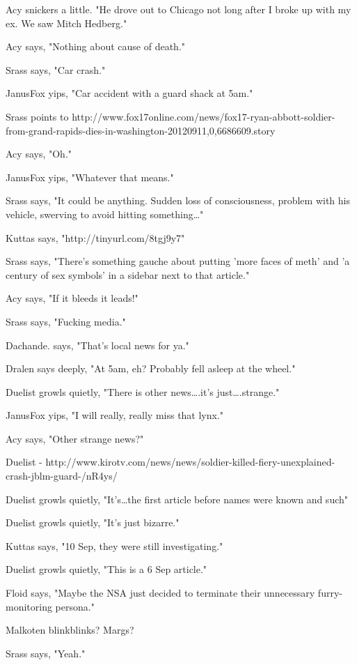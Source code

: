 \begin{hangparas}{2em}{1}
Acy snickers a little. "He drove out to Chicago not long after I broke up with my ex.  We saw Mitch Hedberg."

Acy says, "Nothing about cause of death."

Srass says, "Car crash."

JanusFox yips, "Car accident with a guard shack at 5am."

Srass points to http://www.fox17online.com/news/fox17-ryan-abbott-soldier-from-grand-rapids-dies-in-washington-20120911,0,6686609.story

Acy says, "Oh."

JanusFox yips, "Whatever that means."

Srass says, "It could be anything.  Sudden loss of consciousness, problem with his vehicle, swerving to avoid hitting something\ldots{}"

Kuttas says, "http://tinyurl.com/8tgj9y7"

Srass says, "There's something gauche about putting 'more faces of meth' and 'a century of sex symbols' in a sidebar next to that article."

Acy says, "If it bleeds it leads!"

Srass says, "Fucking media."

Dachande. says, "That's local news for ya."

Dralen says deeply, "At 5am, eh? Probably fell asleep at the wheel."

Duelist growls quietly, "There is other news\ldots{}.it's just\ldots{}.strange."

JanusFox yips, "I will really, really miss that lynx."

Acy says, "Other strange news?"

Duelist - http://www.kirotv.com/news/news/soldier-killed-fiery-unexplained-crash-jblm-guard-/nR4ys/

Duelist growls quietly, "It's\ldots{}the first article before names were known and such"

Duelist growls quietly, "It's just bizarre."

Kuttas says, "10 Sep, they were still investigating."

Duelist growls quietly, "This is a 6 Sep article."

Floid says, "Maybe the NSA just decided to terminate their unnecessary furry-monitoring persona."

Malkoten blinkblinks?  Margs?

Srass says, "Yeah."


\end{hangparas}

